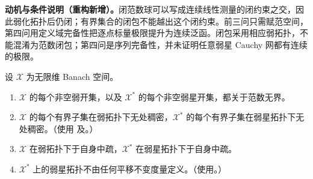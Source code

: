 \documentclass[../../main.tex]{subfiles}
\begin{document}
\begin{remark}
\textbf{动机与条件说明（重构新增）。}闭范数球可以写成连续线性测量的闭约束之交，因此弱化拓扑后仍闭；有界集合的闭包不能越出这个闭约束。前三问只需赋范空间，第四问用定义域完备性把逐点标量极限提升为连续泛函。闭包采用相应弱拓扑，不能混淆为范数闭包；第四问是序列完备性，并未证明任意弱星 Cauchy 网都有连续的极限。
\end{remark}
\begin{exercise}\label{exercise:ch05-weak-topology-smallness}
设 $\mathcal X$ 为无限维 Banach 空间。
\begin{enumerate}
\item\label{item:ch05-weak-open-unbounded} $\mathcal X$ 的每个非空弱开集，以及 $\mathcal X^*$ 的每个非空弱星开集，都关于范数无界。
\item\label{item:ch05-weak-bounded-nowhere-dense} $\mathcal X$ 的每个有界子集在弱拓扑下无处稠密，$\mathcal X^*$ 的每个有界子集在弱星拓扑下无处稠密。（使用 及。）
\item\label{item:ch05-weak-spaces-meager} $\mathcal X$ 在弱拓扑下于自身中疏，$\mathcal X^*$ 在弱星拓扑下于自身中疏。
\item\label{item:ch05-weak-star-not-invariant-metrizable} $\mathcal X^*$ 上的弱星拓扑不由任何平移不变度量定义。（使用。）
\end{enumerate}
\end{exercise}
\end{document}
